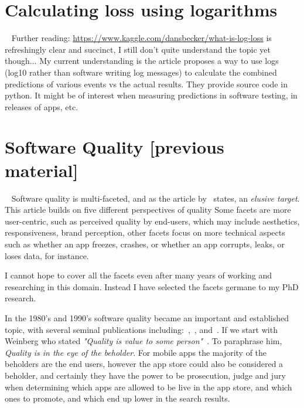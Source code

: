 \section{Calculating loss using logarithms}~\label{irw-section-calculating-loss-using-logarithms}
Further reading: 
\url{https://www.kaggle.com/dansbecker/what-is-log-loss} is refreshingly clear and succinct, I still don't quite understand the topic yet though... My current understanding is the article proposes a way to use logs (log10 rather than software writing log messages) to calculate the combined predictions of various events vs the actual results. They provide source code in python. It might be of interest when measuring predictions in software testing, in releases of apps, etc.




\section{Software Quality [previous material]}~\label{rw-software-quality}
Software quality is multi-faceted, and as the article by~ states, an \emph{elusive target}. This article builds on five different perspectives of quality Some facets are more user-centric, such as perceived quality by end-users, which may include aesthetics, responsiveness, brand perception, other facets focus on more technical aspects such as whether an app freezes, crashes, or whether an app corrupts, leaks, or loses data, for instance. 


I cannot hope to %
cover all the facets even after many years of working and researching in this domain. Instead I have selected the facets germane to my PhD research.

In the 1980's and 1990's software quality became an important and established topic, with several seminal publications including:~,~, and~. If we start with Weinberg who stated \emph{"Quality is value to some person"}~. To paraphrase him, \emph{Quality is in the eye of the beholder}. For mobile apps the majority of the beholders are the end users, however the app store could also be considered a beholder, and certainly they have the power to be prosecution, judge and jury when determining which apps are allowed to be live in the app store, and which ones to promote, and which end up lower in the search results.

